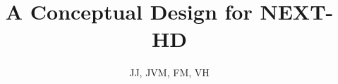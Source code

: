 \documentclass[9pt]{beamer}
\title{A Conceptual Design for NEXT-HD}
\author{JJ, JVM, FM, VH}
\institute{Donostia International Physics Center (DIPC)} %
\begin{document}
\frame{\titlepage}




%
%
\end{document}

